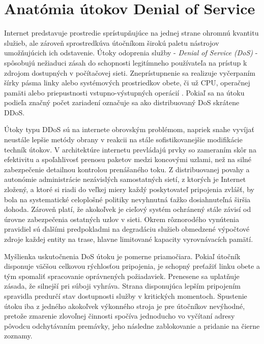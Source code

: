 \documentclass[12pt, a4paper]{article}
\begin{document}
\section{Anatómia útokov Denial of Service}
Internet predstavuje prostredie sprístupňujúce na jednej strane ohromnú kvantitu služieb, ale zároveň 
sprostredkúva útočníkom širokú paletu nástrojov umožňujúcich ich odstavenie. Útoky odoprenia služby
- \emph{Denial of Service (DoS)} - spôsobujú nežiaduci zásah do schopnosti legitímneho 
používateľa na prístup k zdrojom dostupných v počítačovej sieti. Zneprístupnenie sa realizuje vyčerpaním 
šírky pásma linky alebo systémových prostriedkov obete, či už CPU, operačnej pamäti alebo priepustnosti 
vstupno-výstupných operácií \cite{ddos-attacks}. Pokiaľ sa na útoku podieľa značný počet zariadení označuje 
sa ako distribuovaný DoS skrátene DDoS. 

Útoky typu DDoS sú na internete obrovským problémom, napriek snahe vyvíjať neustále lepšie 
metódy obrany v reakcii na stále sofistikovanejšie modifikácie techník útokov. V architektúre internetu 
prevládajú prvky so zameraním skôr na efektivitu a spoľahlivosť prenosu paketov medzi koncovými uzlami, než 
na silné zabezpečenie detailnou kontrolou prenášaného toku. Z distribuovanej povahy a autonómie 
administrácie nezávislých samostatných sietí, z ktorých je Internet zložený, a ktoré si riadi 
do veľkej miery každý poskytovateľ pripojenia zvlášť, by bola na systematické celoplošné politiky nevyhnutná 
ťažko dosiahnuteľná širšia dohoda. Zároveň platí, že akokoľvek je cieľový systém ochránený stále závisí od 
úrovne zabezpečenia ostatných uzlov v sieti. Okrem rôznorodého vynútenia pravidiel sú ďalšími predpokladmi 
na degradáciu služieb obmedzené výpočtové zdroje každej entity na trase, hlavne limitované kapacity 
vyrovnávacích pamätí.

Myšlienka uskutočnenia DoS útoku je pomerne priamočiara. Pokiaľ útočník disponuje väčšou celkovou rýchlosťou 
pripojenia, je schopný preťažiť linku obete a tým spomaliť spracovanie oprávnených požiadaviek. Prenesene sa 
uplatňuje zásada, že silnejší pri súboji vyhráva. Strana disponujúca lepším pripojením spravidla predurčí 
stav dostupnosti služby v kritických momentoch. Spustenie útoku iba z jedného akokoľvek výkonného stroja
je pre útočníkov nevýhodné, pretože zmarenie zlovoľnej činnosti spočíva jednoducho vo vyčítaní adresy 
pôvodcu odchytávaním premávky, jeho následne zablokovanie a pridanie na čierne zoznamy. 
\end{document}
